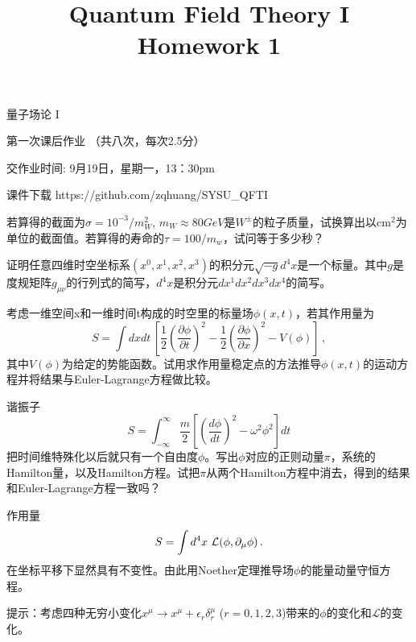 \documentclass[CJK]{beamer}
\title{Quantum Field Theory I \\ Homework 1}
\author{}
\date{}
\begin{document}
\begin{frame}
 
\begin{center}
\begin{Large}
\bch
量子场论 I 

{\vskip 0.3in}

第一次课后作业 （共八次，每次2.5分）

交作业时间: 9月19日，星期一，13：30pm

\ech
\end{Large}
\end{center}

\vskip 0.2in

\bch
课件下载
\ech
https://github.com/zqhuang/SYSU\_QFTI

\end{frame}

\begin{frame}
\bch
若算得的截面为$\sigma = 10^{-3}/m_W^2$, $m_W \approx 80 GeV$是$W^{\pm}$的粒子质量，试换算出以$\mathrm{cm}^2$为单位的截面值。若算得的寿命的$\tau = 100/m_w$，试问等于多少秒？
\ech
\end{frame}



\begin{frame}
\bch
证明任意四维时空坐标系$(x^0, x^1, x^2, x^3)$的积分元$\sqrt{-g}d^4x$是一个标量。其中$g$是度规矩阵$g_{\mu\nu}$的行列式的简写，$d^4x$是积分元$dx^1dx^2dx^3dx^4$的简写。
\ech
\end{frame}


\begin{frame}
\bch
考虑一维空间x和一维时间t构成的时空里的标量场$\phi(x,t)$，若其作用量为
$$ S = \int dx dt \,   \left[ \frac{1}{2}\left(\frac{\partial \phi}{\partial t}\right)^2 -  \frac{1}{2}\left(\frac{\partial \phi}{\partial x}\right)^2 - V(\phi)\right]\, ,$$
其中$V(\phi)$为给定的势能函数。试用求作用量稳定点的方法推导$\phi(x, t)$的运动方程并将结果与Euler-Lagrange方程做比较。
\ech
\end{frame}

\begin{frame}
\bch
谐振子
$$ S = \int_{-\infty}^\infty \frac{m}{2}\left[(\frac{d\phi}{dt})^2 - \omega^2\phi^2\right] dt$$
把时间维特殊化以后就只有一个自由度$\phi$。写出$\phi$对应的正则动量$\pi$，系统的Hamilton量，以及Hamilton方程。试把$\pi$从两个Hamilton方程中消去，得到的结果和Euler-Lagrange方程一致吗？
\ech
\end{frame}


\begin{frame}
\bch
作用量
$$S = \int d^4x\ {\mathcal{L}}(\phi, \partial_\mu\phi)\,.$$
在坐标平移下显然具有不变性。由此用Noether定理推导场$\phi$的能量动量守恒方程。

\skipline

提示：考虑四种无穷小变化$x^\mu \rightarrow x^\mu + \epsilon_r \delta_r^\mu$ ($r = 0, 1, 2, 3$)带来的$\phi$的变化和$\mathcal{L}$的变化。
\ech
\end{frame}
\end{document}
